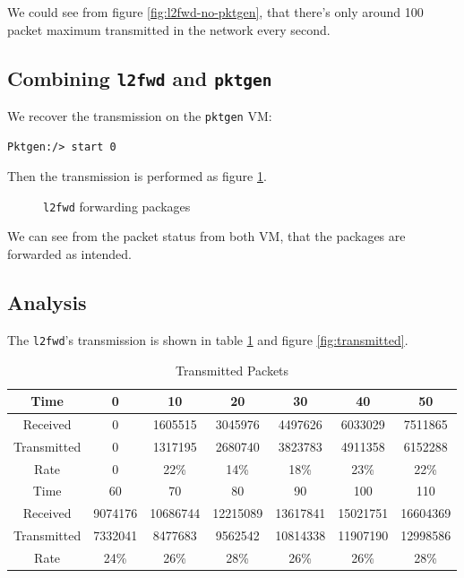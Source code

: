 \documentclass[12pt]{article}
\begin{document}
We could see from figure \ref{fig:l2fwd-no-pktgen}, that there's only around 100 packet maximum transmitted in the network every second.


\subsection{Combining \texttt{l2fwd} and \texttt{pktgen}}

We recover the transmission on the \texttt{pktgen} VM:

\begin{lstlisting}
Pktgen:/> start 0
\end{lstlisting}

Then the transmission is performed as figure \ref{fig:transmission}.

\begin{figure}[ht]
    \centering
    \def\svgwidth{0.3\textwidth}
    \tiny
    
    \caption{\texttt{l2fwd} forwarding packages}
     \label{fig:transmission}
\end{figure}

We can see from the packet status from both VM, that the packages are forwarded as intended.


\subsection{Analysis}

The \texttt{l2fwd}'s transmission is shown in table \ref{tbl:transmitted} and figure \ref{fig:transmitted}.

\begin{table}[ht]
\caption{Transmitted Packets}\label{tbl:transmitted}
\footnotesize
\centering
\begin{tabular}{c|cccccc}
\hline
Time        & 0       & 10       & 20       & 30       & 40       & 50       \\ \hline
Received    & 0       & 1605515  & 3045976  & 4497626  & 6033029  & 7511865  \\
Transmitted & 0       & 1317195  & 2680740  & 3823783  & 4911358  & 6152288  \\
Rate        & 0       & 22\%     & 14\%     & 18\%     & 23\%     & 22\%     \\ \hline
Time        & 60      & 70       & 80       & 90       & 100      & 110      \\
Received    & 9074176 & 10686744 & 12215089 & 13617841 & 15021751 & 16604369 \\
Transmitted & 7332041 & 8477683  & 9562542  & 10814338 & 11907190 & 12998586 \\
Rate        & 24\%    & 26\%     & 28\%     & 26\%     & 26\%     & 28\%     \\ \hline
\end{tabular}
\end{table}
\end{document}
